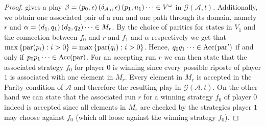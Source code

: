 \begin{proof}
  gives a play 
  $\beta = \left(p_{0},\epsilon\right)\left(\delta_{A_{0}},\epsilon\right)\left(p_{1}, 
  u_{1}\right)\dots\in V^{\omega}$ in $\mathcal{G}(\mathcal{A}, t)$. Additionally,
  we obtain one associated pair of a run and one path through its domain, 
  namely $r$ and $\alpha = \left(d_{1}, q_{1}\right)\left(d_{2}, q_{2}\right)\dots\in 
  M_{r}$. By the choice of parities for states in $V_{1}$ and the connection 
  between $f_{0}$ and $r$ and $f_{1}$ and $\alpha$ respectively we get that 
  $\max\left\{\operatorname{par}(p_{i}):i>0\right\} = \max\left\{\operatorname{par}(q_{i}):i>0\right\}$. Hence,
  $q_{0}q_{1}\dots\in\operatorname{Acc}(\operatorname{par}')$ if and only if 
  $p_{0}p_{1}\dots\in\operatorname{Acc}(\operatorname{par})$. For an accepting run $r$ we can then state
  that the associated strategy $f_{0}$ for player $0$ is winning since every
  possible riposte of player $1$ is associated with one element in $M_{r}$.
  Every element in $M_{r}$ is accepted in the Parity-condition of $\mathcal{A}$
  and therefore the resulting play in $\mathcal{G}(\mathcal{A}, t)$. On the 
  other hand we can state that the associated run $r$ for a winning strategy 
  $f_{0}$ of player $0$ indeed is accepted since all elements in $M_{r}$ are
  checked by the strategies player $1$ may choose against $f_{0}$ (which all 
  loose against the winning strategy $f_{0}$).
\end{proof}

